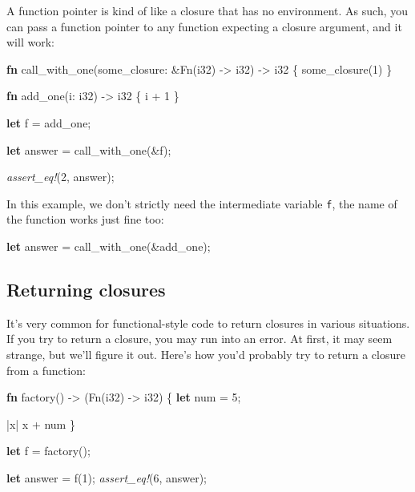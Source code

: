 \documentclass[a4paper,]{book}
\newenvironment{Shaded}{\begin{snugshade}}{\end{snugshade}}
\newcommand{\KeywordTok}[1]{\textcolor[rgb]{0.13,0.29,0.53}{\textbf{{#1}}}}
\newcommand{\DataTypeTok}[1]{\textcolor[rgb]{0.13,0.29,0.53}{{#1}}}
\newcommand{\DecValTok}[1]{\textcolor[rgb]{0.00,0.00,0.81}{{#1}}}
\newcommand{\BuiltInTok}[1]{{#1}}
\newcommand{\PreprocessorTok}[1]{\textcolor[rgb]{0.56,0.35,0.01}{\textit{{#1}}}}
\newcommand{\NormalTok}[1]{{#1}}
\begin{document}
A function pointer is kind of like a closure that has no environment. As
such, you can pass a function pointer to any function expecting a
closure argument, and it will work:

\begin{Shaded}
\begin{Highlighting}[]
\KeywordTok{fn} \NormalTok{call_with_one(some_closure: &}\BuiltInTok{Fn}\NormalTok{(}\DataTypeTok{i32}\NormalTok{) -> }\DataTypeTok{i32}\NormalTok{) -> }\DataTypeTok{i32} \NormalTok{\{}
    \NormalTok{some_closure(}\DecValTok{1}\NormalTok{)}
\NormalTok{\}}

\KeywordTok{fn} \NormalTok{add_one(i: }\DataTypeTok{i32}\NormalTok{) -> }\DataTypeTok{i32} \NormalTok{\{}
    \NormalTok{i + }\DecValTok{1}
\NormalTok{\}}

\KeywordTok{let} \NormalTok{f = add_one;}

\KeywordTok{let} \NormalTok{answer = call_with_one(&f);}

\PreprocessorTok{assert_eq!}\NormalTok{(}\DecValTok{2}\NormalTok{, answer);}
\end{Highlighting}
\end{Shaded}

In this example, we don't strictly need the intermediate variable
\texttt{f}, the name of the function works just fine too:

\begin{Shaded}
\begin{Highlighting}[]
\KeywordTok{let} \NormalTok{answer = call_with_one(&add_one);}
\end{Highlighting}
\end{Shaded}

\subsection{Returning closures}\label{returning-closures}

It's very common for functional-style code to return closures in various
situations. If you try to return a closure, you may run into an error.
At first, it may seem strange, but we'll figure it out. Here's how you'd
probably try to return a closure from a function:

\begin{Shaded}
\begin{Highlighting}[]
\KeywordTok{fn} \NormalTok{factory() -> (}\BuiltInTok{Fn}\NormalTok{(}\DataTypeTok{i32}\NormalTok{) -> }\DataTypeTok{i32}\NormalTok{) \{}
    \KeywordTok{let} \NormalTok{num = }\DecValTok{5}\NormalTok{;}

    \NormalTok{|x| x + num}
\NormalTok{\}}

\KeywordTok{let} \NormalTok{f = factory();}

\KeywordTok{let} \NormalTok{answer = f(}\DecValTok{1}\NormalTok{);}
\PreprocessorTok{assert_eq!}\NormalTok{(}\DecValTok{6}\NormalTok{, answer);}
\end{Highlighting}
\end{Shaded}
\end{document}

